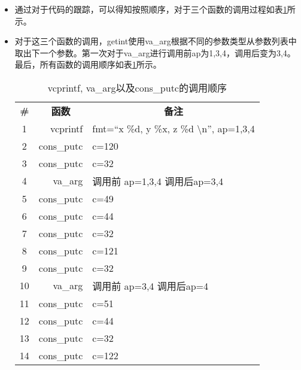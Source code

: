 \begin{enumerate}
\begin{itemize}
                \begin{figure}[htb]
                    \centering
                    \texttt{[image: lab1/exercise8\_3.png]}
                    \caption{fmt以及ap的取值}
                    \label{fig:exercise8_3}
                \end{figure}
            \item 通过对于代码的跟踪，可以得知按照顺序，对于三个函数的调用过程如表\ref{tab:8_1}所示。
            \item 对于这三个函数的调用，getint使用va\_arg根据不同的参数类型从参数列表中取出下一个参数。第一次对于va\_arg进行调用前ap为1,3,4，调用后变为3,4。最后，所有函数的调用顺序如表\ref{tab:8_1}所示。
                \begin{table}[H]
                    \centering
                    \caption{vcprintf, va\_arg以及cons\_putc的调用顺序}
                    \label{tab:8_1}
                    \begin{tabular}{c r l}
                        \toprule
                        \multicolumn{1}{c}{\textbf{\#}} &
                        \multicolumn{1}{c}{\textbf{函数}} &
                        \multicolumn{1}{c}{\textbf{备注}} \\
                        \cmidrule(lr){1-3}
                        1  & vcprintf  & fmt=``x \%d, y \%x, z \%d \textbackslash n'', ap=1,3,4 \\
                        2  & cons\_putc & c=120 \\
                        3  & cons\_putc & c=32  \\
                        4  & va\_arg    & 调用前 ap=1,3,4 调用后ap=3,4 \\
                        5  & cons\_putc & c=49  \\
                        6  & cons\_putc & c=44  \\
                        7  & cons\_putc & c=32  \\
                        8  & cons\_putc & c=121 \\
                        9  & cons\_putc & c=32  \\
                        10 & va\_arg    & 调用前 ap=3,4 调用后ap=4 \\
                        11 & cons\_putc & c=51  \\
                        12 & cons\_putc & c=44  \\
                        13 & cons\_putc & c=32  \\
                        14 & cons\_putc & c=122 \\

\end{tabular}
\end{table}
\end{itemize}
\end{enumerate}
